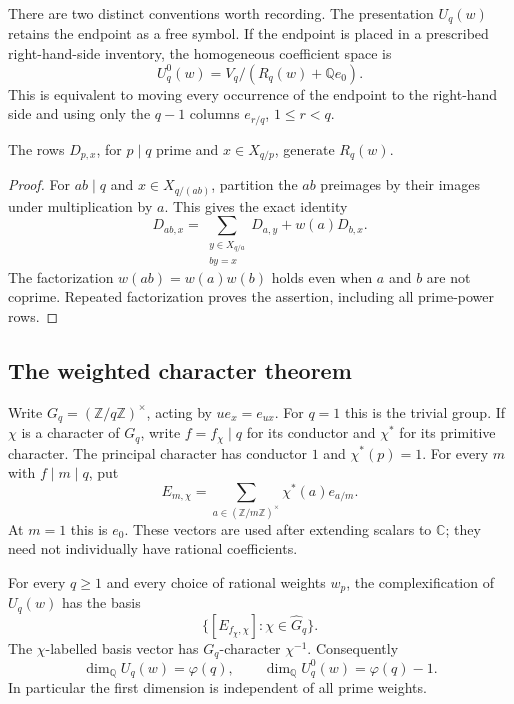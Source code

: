 There are two distinct conventions worth recording.  The presentation
$U_q(w)$ retains the endpoint as a free symbol.  If the endpoint is placed
in a prescribed right-hand-side inventory, the homogeneous coefficient
space is
\begin{equation}\label{rank:endpoint}
 U_q^0(w)=V_q/(R_q(w)+\mathbb Q e_0).
\end{equation}
This is equivalent to moving every occurrence of the endpoint to the
right-hand side and using only the $q-1$ columns $e_{r/q}$,
$1\leq r<q$.

\begin{lemma}\label{rank:prime}
The rows $D_{p,x}$, for $p\mid q$ prime and $x\in X_{q/p}$, generate
$R_q(w)$.
\end{lemma}
\begin{proof}
For $ab\mid q$ and $x\in X_{q/(ab)}$, partition the $ab$ preimages by
their images under multiplication by $a$.  This gives the exact identity
\[
 D_{ab,x}=\sum_{\substack{y\in X_{q/a}\\by=x}}D_{a,y}
             +w(a)D_{b,x}.
\]
The factorization $w(ab)=w(a)w(b)$ holds even when $a$ and $b$ are not
coprime.  Repeated factorization proves the assertion, including all
prime-power rows.
\end{proof}

\subsection{The weighted character theorem}

Write $G_q=(\mathbb Z/q\mathbb Z)^\times$, acting by $u e_x=e_{ux}$.
For $q=1$ this is the trivial group.  If $\chi$ is a character of $G_q$,
write $f=f_\chi\mid q$ for its conductor and $\chi^*$ for its primitive
character.  The principal character has conductor $1$ and
$\chi^*(p)=1$.  For every $m$ with $f\mid m\mid q$, put
\begin{equation}\label{rank:E}
 E_{m,\chi}=
 \sum_{a\in(\mathbb Z/m\mathbb Z)^\times}
       \chi^*(a)e_{a/m}.
\end{equation}
At $m=1$ this is $e_0$.  These vectors are used after extending scalars to
$\mathbb C$; they need not individually have rational coefficients.

\begin{theorem}\label{rank:main}
For every $q\geq1$ and every choice of rational weights $w_p$, the
complexification of $U_q(w)$ has the basis
\[
 \bigl\{[E_{f_\chi,\chi}]:\chi\in\widehat G_q\bigr\}.
\]
The $\chi$-labelled basis vector has $G_q$-character $\chi^{-1}$.
Consequently
\begin{equation}\label{rank:dimensions}
 \dim_{\mathbb Q} U_q(w)=\varphi(q),
 \qquad
 \dim_{\mathbb Q} U_q^0(w)=\varphi(q)-1.
\end{equation}
In particular the first dimension is independent of all prime weights.
\end{theorem}

